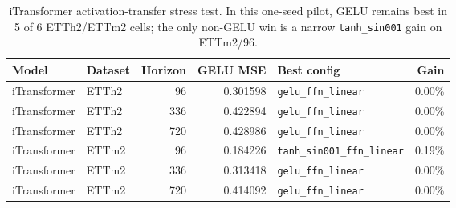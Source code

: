 \begin{table}[t]
\centering
\caption{iTransformer activation-transfer stress test. In this one-seed pilot, GELU remains best in 5 of 6 ETTh2/ETTm2 cells; the only non-GELU win is a narrow \texttt{tanh\_sin001} gain on ETTm2/96.}
\label{tab:itransformer_transfer}
\begin{tabular}{llrrlr}
\toprule
Model & Dataset & Horizon & GELU MSE & Best config & Gain \\
\midrule
iTransformer & ETTh2 & 96 & 0.301598 & \texttt{gelu\_ffn\_linear} & 0.00\% \\
iTransformer & ETTh2 & 336 & 0.422894 & \texttt{gelu\_ffn\_linear} & 0.00\% \\
iTransformer & ETTh2 & 720 & 0.428986 & \texttt{gelu\_ffn\_linear} & 0.00\% \\
iTransformer & ETTm2 & 96 & 0.184226 & \texttt{tanh\_sin001\_ffn\_linear} & 0.19\% \\
iTransformer & ETTm2 & 336 & 0.313418 & \texttt{gelu\_ffn\_linear} & 0.00\% \\
iTransformer & ETTm2 & 720 & 0.414092 & \texttt{gelu\_ffn\_linear} & 0.00\% \\
\bottomrule
\end{tabular}
\end{table}
